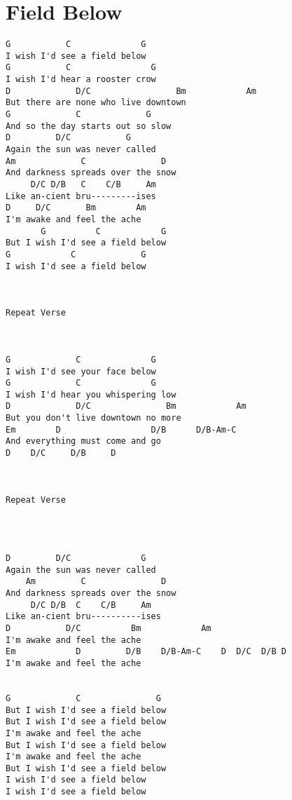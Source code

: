 \documentclass[leqno]{memoir}
\begin{document}
\chapter{Field Below}
\begin{verbatim}
G           C              G
I wish I'd see a field below
G           C                G
I wish I'd hear a rooster crow
D             D/C                 Bm            Am    
But there are none who live downtown
G             C             G
And so the day starts out so slow
D         D/C           G
Again the sun was never called
Am             C               D
And darkness spreads over the snow
     D/C D/B   C    C/B     Am
Like an-cient bru---------ises
D     D/C       Bm        Am
I'm awake and feel the ache
       G          C            G
But I wish I'd see a field below
G            C             G
I wish I'd see a field below



Repeat Verse



G             C              G
I wish I'd see your face below
G             C              G
I wish I'd hear you whispering low
D             D/C               Bm            Am
But you don't live downtown no more
Em        D                  D/B      D/B-Am-C
And everything must come and go
D    D/C     D/B     D



Repeat Verse




D         D/C              G
Again the sun was never called
    Am         C               D
And darkness spreads over the snow
     D/C D/B  C    C/B     Am
Like an-cient bru----------ises
D           D/C          Bm            Am
I'm awake and feel the ache
Em            D         D/B    D/B-Am-C    D  D/C  D/B D
I'm awake and feel the ache


G             C               G
But I wish I'd see a field below
But I wish I'd see a field below
I'm awake and feel the ache
But I wish I'd see a field below
I'm awake and feel the ache
But I wish I'd see a field below
I wish I'd see a field below
I wish I'd see a field below
\end{verbatim}
\newpage
\end{document}
